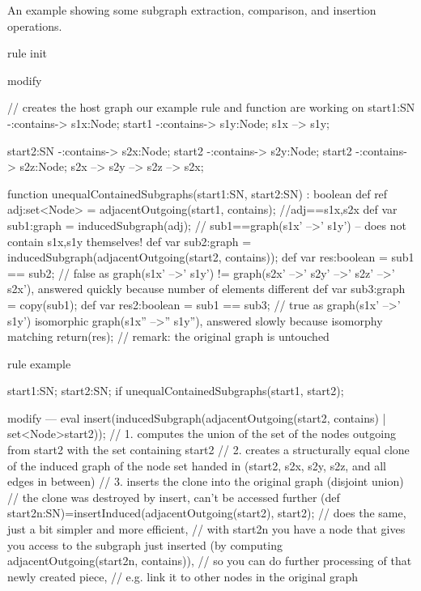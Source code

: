 \begin{example}
An example showing some subgraph extraction, comparison, and insertion operations.
\begin{grgen}
rule init
{
	modify { // creates the host graph our example rule and function are working on
		start1:SN -:contains-> s1x:Node;
		start1    -:contains-> s1y:Node;
		s1x --> s1y;

		start2:SN -:contains-> s2x:Node;
		start2    -:contains-> s2y:Node;
		start2    -:contains-> s2z:Node;
		s2x --> s2y --> s2z --> s2x;
	}
}

function unequalContainedSubgraphs(start1:SN, start2:SN) : boolean
{
	def ref adj:set<Node> = adjacentOutgoing(start1, contains); //adj=={s1x,s2x}
	def var sub1:graph = inducedSubgraph(adj); // sub1==graph(s1x' -->' s1y') -- does not contain s1x,s1y themselves!
	def var sub2:graph = inducedSubgraph(adjacentOutgoing(start2, contains));
	def var res:boolean = sub1 == sub2; // false as graph(s1x' -->' s1y') != graph(s2x' -->' s2y' -->' s2z' -->' s2x'), answered quickly because number of elements different
	def var sub3:graph = copy(sub1);
	def var res2:boolean = sub1 == sub3; // true as graph(s1x' -->' s1y') isomorphic graph(s1x'' -->'' s1y''), answered slowly because isomorphy matching
	return(res); // remark: the original graph is untouched
}

rule example
{
	start1:SN; start2:SN;
	if{ unequalContainedSubgraphs(start1, start2); }
	
	modify {
	---
		eval {
			insert(inducedSubgraph(adjacentOutgoing(start2, contains) | set<Node>{start2}));
				// 1. computes the union of the set of the nodes outgoing from start2 with the set containing start2
				// 2. creates a structurally equal clone of the induced graph of the node set handed in (start2, s2x, s2y, s2z, and all edges in between)
				// 3. inserts the clone into the original graph (disjoint union)
				// the clone was destroyed by insert, can't be accessed further
			(def start2n:SN)=insertInduced(adjacentOutgoing(start2), start2);
				// does the same, just a bit simpler and more efficient, 
				// with start2n you have a node that gives you access to the subgraph just inserted (by computing adjacentOutgoing(start2n, contains)),
				// so you can do further processing of that newly created piece,
				// e.g. link it to other nodes in the original graph
		}
	}
}
\end{grgen}
\end{example}


